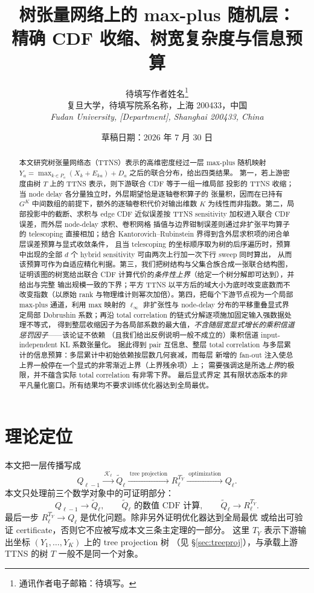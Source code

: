 \documentclass[a4paper,11pt]{article}
\title{树张量网络上的 max-plus 随机层：\\
精确 CDF 收缩、树宽复杂度与信息预算}
\author{%
待填写作者姓名\thanks{通讯作者电子邮箱：待填写。}\\[0.3em]
\normalsize 复旦大学，待填写院系名称，上海 200433，中国\\[0.2em]
\normalsize\itshape Fudan University, \textup{[Department]},
Shanghai 200433, China
}
\date{草稿日期：2026 年 7 月 30 日}
\theoremstyle{definition}
\newcommand{\1}{\mathbf 1}
\begin{document}
\maketitle

\begin{abstract}
本文研究树张量网络态（TTNS）表示的高维密度经过一层 max-plus 随机映射
$Y_a=\max_{k\in P_a}(X_k+E_{ka})+D_a$ 之后的联合分布，给出四类结果。
第一，若上游密度由树 $T$ 上的 TTNS 表示，则下游联合 CDF 等于一组一维局部
投影的 TTNS 收缩；当 node delay 各分量独立时，外层期望恰是逐轴卷积算子的
张量积，因而在已持有 $G^K$ 中间数组的前提下，额外的逐轴卷积代价对输出维数
$K$ 为线性而非指数。第二，局部投影中的截断、求积与 edge CDF 近似误差按
TTNS sensitivity 加权进入联合 CDF 误差，而外层 node-delay 求积、卷积网格
插值与边界钳制误差则通过非扩张平均算子的 telescoping 直接相加；结合
Kantorovich--Rubinstein 界得到含外层求积项的闭合单层误差预算与显式收敛条件，
且当 telescoping 的坐标顺序取为树的后序遍历时，预算中出现的全部 $d$ 个
hybrid sensitivity 可由两次上行加一次下行 sweep 同时算出，
从而该预算可作为自适应精化判据。第三，我们把树结构与父集合族合成一张联合结构图，证明该图的树宽给出联合
CDF 计算代价的\emph{条件性上界}（给定一个树分解即可达到），并给出与完整
输出规模一致的下界；平方 TTNS 以平方后的域大小为底时改变底数而不
改变指数（以原始 rank 与物理维计则幂次加倍）。第四，把每个下游节点视为一个局部 max-plus 通道，利用 max 映射的
$\ell_\infty$ 非扩张性与 node-delay 分布的平移重叠显式界定局部 Dobrushin
系数；再沿 total correlation 的链式分解逐项施加固定输入强数据处理不等式，
得到整层收缩因子为各局部系数的最大值，\emph{不含随层宽显式增长的乘积信道
惩罚因子}——该论证不依赖
（且我们给出反例说明一般不成立的）乘积信道 input-independent KL 系数张量化。
据此得到 pair 互信息、整层 total
correlation 与多层累计的信息预算：多层累计中初始依赖按层数几何衰减，而每层
新增的 fan-out 注入使总上界一般停在一个显式的非零渐近上界（上界残余项）上；
需要强调这是所选\emph{上界}的极限，并不蕴含实际 total correlation 有非零下界。
最后显式界定
其有限状态版本的非平凡量化窗口。所有结果均不要求训练优化器达到全局最优。
\end{abstract}

\tableofcontents

\section{理论定位}

本文把一层传播写成
\[
Q_{\ell-1}
\xrightarrow{\;\mathcal K_\ell\;}
\widetilde Q_\ell
\xrightarrow{\;\text{tree projection}\;}
R_\ell^{T_Y}
\xrightarrow{\;\text{optimization}\;}
Q_\ell.
\]
本文只处理前三个数学对象中的可证明部分：
\[
Q_{\ell-1}\to \widetilde Q_\ell,
\qquad
\widetilde Q_\ell \text{ 的数值 CDF 计算},
\qquad
\widetilde Q_\ell\to R_\ell^{T_Y}.
\]
最后一步 $R_\ell^{T_Y}\to Q_\ell$ 是优化问题。除非另外证明优化器达到全局最优
或给出可验证 certificate，否则它不应被写成本文三条主定理的一部分。
这里 $T_Y$ 表示下游输出坐标 $(Y_1,\ldots,Y_K)$ 上的 tree projection 树
（见 \S\ref{sec:treeproj}），与承载上游 TTNS 的树 $T$ 一般不是同一个对象。
\end{document}
